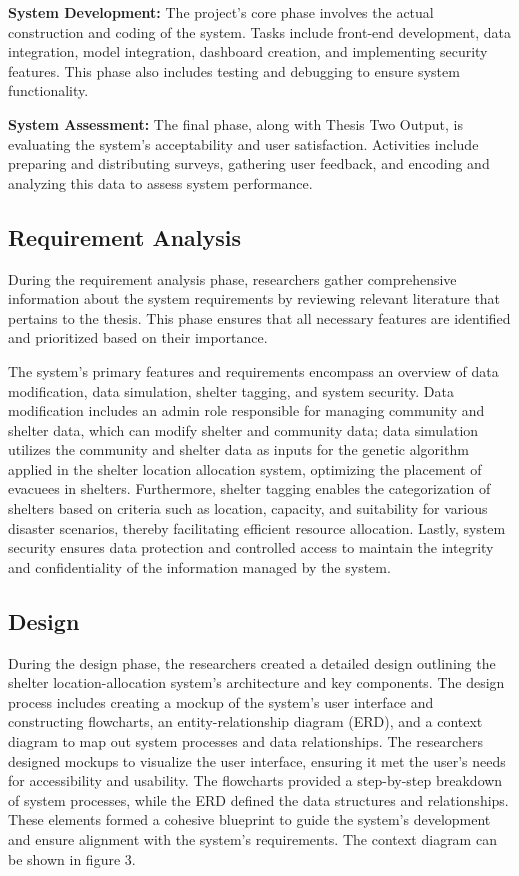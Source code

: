 	\textbf{System Development:} The project's core phase involves the actual construction and coding of the system. Tasks include front-end development, data integration, model integration, dashboard creation, and implementing security features. This phase also includes testing and debugging to ensure system functionality.
	
	\textbf{System Assessment:} The final phase, along with Thesis Two Output, is evaluating the system's acceptability and user satisfaction. Activities include preparing and distributing surveys, gathering user feedback, and encoding and analyzing this data to assess system performance.

\subsection{Requirement Analysis}
	During the requirement analysis phase, researchers gather comprehensive information about the system requirements by reviewing relevant literature that pertains to the thesis. This phase ensures that all necessary features are identified and prioritized based on their importance.
	
	The system's primary features and requirements encompass an overview of data modification, data simulation, shelter tagging, and system security. Data modification includes an admin role responsible for managing community and shelter data, which can modify shelter and community data; data simulation utilizes the community and shelter data as inputs for the genetic algorithm applied in the shelter location allocation system, optimizing the placement of evacuees in shelters. Furthermore, shelter tagging enables the categorization of shelters based on criteria such as location, capacity, and suitability for various disaster scenarios, thereby facilitating efficient resource allocation. Lastly, system security ensures data protection and controlled access to maintain the integrity and confidentiality of the information managed by the system.

\subsection{Design}
	During the design phase, the researchers created a detailed design outlining the shelter location-allocation system's architecture and key components. The design process includes creating a mockup of the system's user interface and constructing flowcharts, an entity-relationship diagram (ERD), and a context diagram to map out system processes and data relationships. The researchers designed mockups to visualize the user interface, ensuring it met the user's needs for accessibility and usability. The flowcharts provided a step-by-step breakdown of system processes, while the ERD defined the data structures and relationships. These elements formed a cohesive blueprint to guide the system's development and ensure alignment with the system's requirements. The context diagram can be shown in figure 3.


